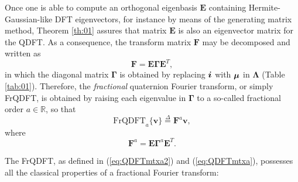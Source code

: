 Once one is able to compute an orthogonal eigenbasis $ \mathbf{E} $ containing Hermite-Gaussian-like DFT eigenvectors, for instance by means of the generating matrix method, Theorem \ref{th:01} assures that matrix $ \mathbf{E} $ is also an eigenvector matrix for the QDFT. As a consequence, the transform matrix $ \mathbf{F} $ may be decomposed and written as
\begin{equation}
\label{eq:QDFTmtx}
\mathbf{F} = \mathbf{E} \mathbf{\Gamma} \mathbf{E}^T,
\end{equation}
in which the diagonal matrix $ \mathbf{\Gamma} $ is obtained by replacing $ \boldsymbol{i} $ with $ \boldsymbol{\mu} $ in $ \mathbf{\Lambda} $ (Table \ref{tab:01}). Therefore, the \textit{fractional} quaternion Fourier transform, or simply FrQDFT, is obtained by raising each eigenvalue in $ \mathbf{\Gamma} $ to a so-called fractional order $ a \in \mathbb{R} $, so that
\begin{equation}
\label{eq:QDFTmtxa2}
\text{FrQDFT}_a\{ \mathbf{v} \} \overset{\Delta}{=} \mathbf{F}^a \mathbf{v},
\end{equation}
where
\begin{equation}
\label{eq:QDFTmtxa}
\mathbf{F}^a = \mathbf{E} \mathbf{\Gamma}^a \mathbf{E}^T.
\end{equation}

The FrQDFT, as defined in (\ref{eq:QDFTmtxa2}) and (\ref{eq:QDFTmtxa}), possesses all the classical properties of a fractional Fourier transform:

